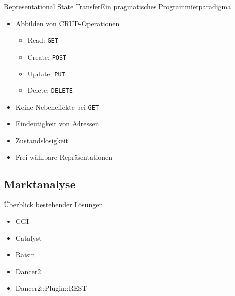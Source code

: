\documentclass[aspectratio=1610]{beamer}
\begin{document}

\begin{frame}{Representational State Transfer}{Ein pragmatisches Programmierparadigma}
    \begin{itemize}
        \item Abbilden von CRUD-Operationen
        \pause
        \begin{itemize}
            \item Read: \texttt{GET}
            \pause
            \item Create: \texttt{POST}
            \pause
            \item Update: \texttt{PUT}
            \pause
            \item Delete: \texttt{DELETE}
            \pause
        \end{itemize}
        \item Keine Nebeneffekte bei \texttt{GET}
        \pause
        \item Eindeutigkeit von Adressen
        \pause
        \item Zustandslosigkeit
        \pause
        \item Frei wählbare Repräsentationen
    \end{itemize}
\end{frame}


\subsection{Marktanalyse}


\begin{frame}{Überblick bestehender Lösungen}
    \begin{itemize}
        \item CGI
        \pause
        \item Catalyst
        \pause
        \item Raisin
        \pause
        \item Dancer2
        \pause
        \item Dancer2::Plugin::REST
    \end{itemize}
\end{frame}
\end{document}
